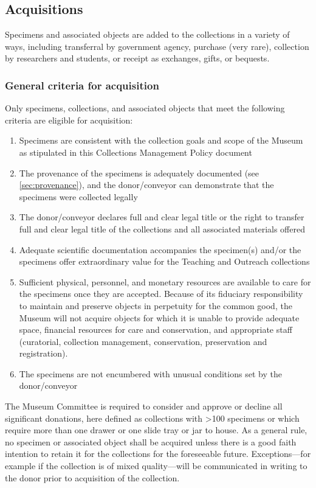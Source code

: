 \documentclass[letterpaper, 11pt]{article}
\begin{document}
\subsection{Acquisitions}
Specimens and associated objects are added to the collections in a variety of ways, including transferral by government agency, purchase (very rare), collection by researchers and students, or receipt as exchanges, gifts, or bequests.

\subsubsection{General criteria for acquisition}
Only specimens, collections, and associated objects that meet the following criteria are eligible for acquisition: 
\begin{enumerate}
\item Specimens are consistent with the collection goals and scope of the Museum as stipulated in this Collections Management Policy document
\item The provenance of the specimens is adequately documented (see \ref{sec:provenance}), and the donor/conveyor can demonstrate that the specimens were collected legally
\item The donor/conveyor declares full and clear legal title or the right to transfer full and clear legal title of the collections and all associated materials offered
\item Adequate scientific documentation accompanies the specimen(s) and/or the specimens offer extraordinary value for the Teaching and Outreach collections
\item Sufficient physical, personnel, and monetary resources are available to care for the specimens once they are accepted. Because of its fiduciary responsibility to maintain and preserve objects in perpetuity for the common good, the Museum will not acquire objects for which it is unable to provide adequate space, financial resources for care and conservation, and appropriate staff (curatorial, collection management, conservation, preservation and registration).
\item The specimens are not encumbered with unusual conditions set by the donor/conveyor
\end{enumerate}

\noindent{}The Museum Committee is required to consider and approve or decline all significant donations, here defined as collections with \textgreater100 specimens or which require more than one drawer or one slide tray or jar to house. As a general rule, no specimen or associated object shall be acquired unless there is a good faith intention to retain it for the collections for the foreseeable future. Exceptions---for example if the collection is of mixed quality---will be communicated in writing to the donor prior to acquisition of the collection.
\end{document}
